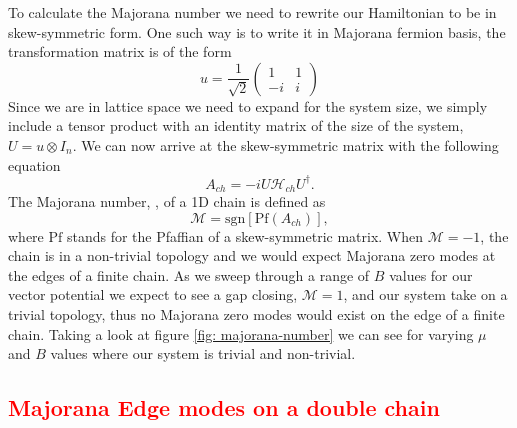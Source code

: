 \documentclass[aps,prb,showpacs,amsmath,amssymb,superscriptaddress]{revtex4-2}
\newcommand{\Red}[1]{\textcolor{red}{#1}}
\newcommand{\Ham}{\mathcal{H}}
\begin{document}
To calculate the Majorana number we need to rewrite our Hamiltonian to be in skew-symmetric form.
One such way is to write it in Majorana fermion basis, the transformation matrix is of the form
\[
  u = \dfrac{1}{\sqrt{2}} \left(
  \begin{matrix}
    1 & 1 \\
    -i & i
\end{matrix} \right)
\]
Since we are in lattice space we need to expand for the system size, we simply include a tensor product with an identity matrix of the size of the system, $U = u \otimes I_n$.
We can now arrive at the skew-symmetric matrix with the following equation
\begin{equation}
  A_{ch} = -i U \Ham_{ch} U^{\dagger}.
\end{equation}
The Majorana number, , of a 1D chain is defined as
\begin{equation}
  \mathcal{M} = \text{sgn}[\text{Pf}(A_{ch})],
\end{equation}
where $\text{Pf}$ stands for the Pfaffian of a skew-symmetric matrix.
When $\mathcal{M} = -1$, the chain is in a non-trivial topology and we would expect Majorana zero modes at the edges of a finite chain.
As we sweep through a range of $B$ values for our vector potential we expect to see a gap closing, $\mathcal{M} = 1$, and our system take on a trivial topology, thus no Majorana zero modes would exist on the edge of a finite chain.
Taking a look at figure \ref{fig: majorana-number} we can see for varying $\mu$ and $B$ values where our system is trivial and non-trivial.

\subsection{\Red{Majorana Edge modes on a double chain}}
\end{document}

